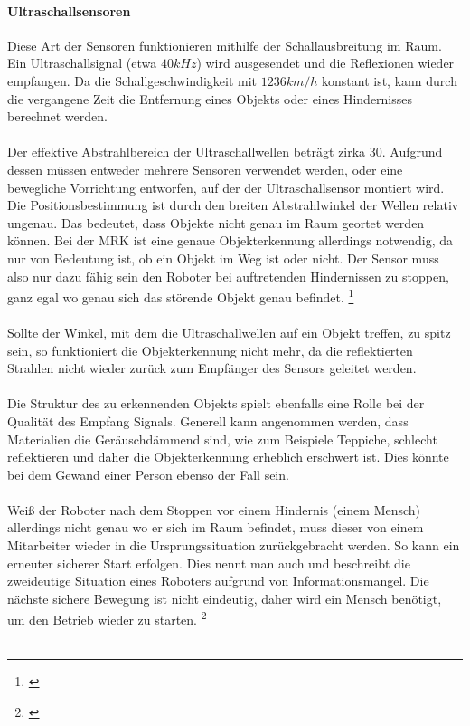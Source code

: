 \documentclass[titlepage,12pt,twoside]{article}
\begin{document}
\paragraph{Ultraschallsensoren}
\hfill \break
\hfill \break
Diese Art der Sensoren funktionieren mithilfe der Schallausbreitung im Raum. Ein 
Ultraschallsignal (etwa $40kHz$) wird ausgesendet und die Reflexionen wieder 
empfangen. Da die Schallgeschwindigkeit mit $1236 km/h$ konstant ist, kann durch
die vergangene Zeit die Entfernung eines Objekts oder eines Hindernisses berechnet 
werden. \\
\\
Der effektive Abstrahlbereich der Ultraschallwellen beträgt zirka 30\textdegree. 
Aufgrund dessen müssen entweder mehrere Sensoren verwendet werden, oder eine 
bewegliche Vorrichtung entworfen, auf der der Ultraschallsensor montiert wird. 
Die Positionsbestimmung ist durch den breiten Abstrahlwinkel der Wellen relativ 
ungenau. Das bedeutet, dass Objekte nicht genau im Raum geortet werden können. 
Bei der MRK ist eine genaue Objekterkennung allerdings notwendig, da nur von 
Bedeutung ist, ob ein Objekt im Weg ist oder nicht. Der Sensor muss also nur dazu 
fähig sein den Roboter bei auftretenden Hindernissen zu stoppen, ganz egal wo 
genau sich das störende Objekt genau befindet. \footnote{\cite{Generationrobots}} \\
\\
Sollte der Winkel, mit dem die Ultraschallwellen auf ein Objekt treffen, zu spitz 
sein, so funktioniert die Objekterkennung nicht mehr, da die reflektierten 
Strahlen nicht wieder zurück zum Empfänger des Sensors geleitet werden. \\
\\
Die Struktur des zu erkennenden Objekts spielt ebenfalls eine Rolle bei der 
Qualität des Empfang Signals. Generell kann angenommen werden, dass Materialien 
die Geräuschdämmend sind, wie zum Beispiele Teppiche, schlecht reflektieren und 
daher die Objekterkennung erheblich erschwert ist. Dies könnte bei dem Gewand 
einer Person ebenso der Fall sein. \\
\\
Weiß der Roboter nach dem Stoppen vor einem Hindernis (einem Mensch) allerdings 
nicht genau wo er sich im Raum befindet, muss dieser von einem Mitarbeiter wieder 
in die Ursprungssituation zurückgebracht werden. So kann ein erneuter sicherer 
Start erfolgen. Dies nennt man auch  und beschreibt die 
zweideutige Situation eines Roboters aufgrund von Informationsmangel. Die nächste 
sichere Bewegung ist nicht eindeutig, daher wird ein Mensch benötigt, um den 
Betrieb wieder zu starten. \footnote{\cite{Generationrobots}} \\
\\
\end{document}
